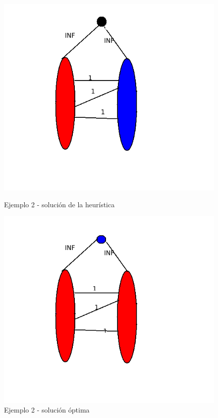 \documentclass[11pt, a4paper, twoside]{article}
\begin{document}
\begin{enumerate}
\begin{enumerate}
		\begin{figure}[H]
		\begin{minipage}{.6\textwidth}
		\centering
		\includegraphics[width=.8\linewidth]{imagenes/ej3_21}
		\caption{Ejemplo 2 - solución de la heurística}
		\end{minipage}
		\begin{minipage}{.6\textwidth}
		\includegraphics[width=.8\linewidth]{imagenes/ej3_22}
		\caption{Ejemplo 2 - solución óptima}
		\end{minipage}
		\end{figure}
		

\end{enumerate}
\end{enumerate}
\end{document}
